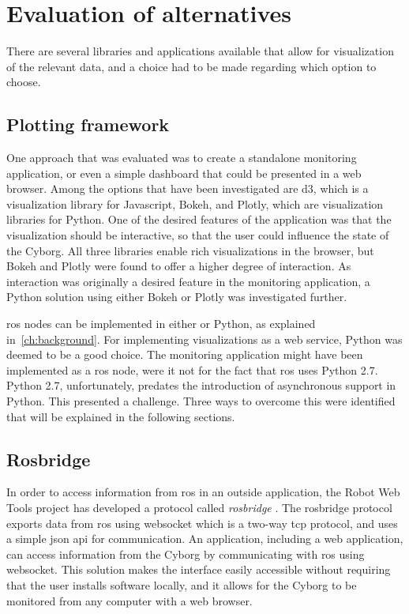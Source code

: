 \documentclass[\rootfolder/main.tex]{subfiles}
\begin{document}

\section{Evaluation of alternatives}

There are several libraries and applications available that allow for visualization of the relevant data, and a choice had to be made regarding which option to choose.

\subsection{Plotting framework}

One approach that was evaluated was to create a standalone monitoring application, or even a simple dashboard that could be presented in a web browser.
Among the options that have been investigated are d3, which is a visualization library for Javascript, Bokeh, and Plotly, which are visualization libraries for Python.
One of the desired features of the application was that the visualization should be interactive, so that the user could influence the state of the Cyborg.
All three libraries enable rich visualizations in the browser, but Bokeh and Plotly were found to offer a higher degree of interaction.
As interaction was originally a desired feature in the monitoring application, a Python solution using either Bokeh or Plotly was investigated further.

\acrshort{ros} nodes can be implemented in either \CC or Python, as explained in~\cref{ch:background}.
For implementing visualizations as a web service, Python was deemed to be a good choice.
The monitoring application might have been implemented as a \acrshort{ros} node, were it not for the fact that \acrshort{ros} uses Python 2.7. Python 2.7, unfortunately, predates the introduction of asynchronous support in Python.
This presented a challenge.
Three ways to overcome this were identified that will be explained in the following sections.

\subsection{Rosbridge}

In order to access information from \acrshort{ros} in an outside application, the Robot Web Tools project has developed a protocol called \emph{rosbridge} \cite{Toris}.
The rosbridge protocol exports data from \acrshort{ros} using websocket which is a two-way \acrshort{tcp} protocol, and uses a simple \acrshort{json} \acrshort{api} for communication.
An application, including a web application, can access information from the Cyborg by communicating with \acrshort{ros} using websocket.
This solution makes the interface easily accessible without requiring that the user installs software locally, and it allows for the Cyborg to be monitored from any computer with a web browser.
\end{document}
